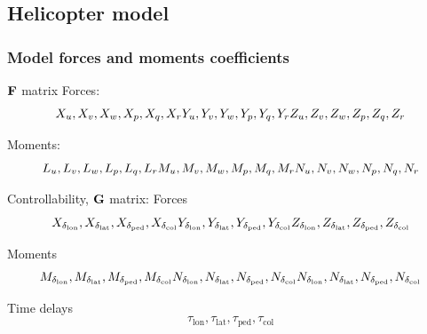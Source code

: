 \subsection{Helicopter model}

  \subsubsection{Model forces and moments coefficients}
    $\mathrm{\textbf{F}}$ matrix
    Forces: 
    $$
    X_u, X_v, X_w, X_p, X_q, X_r \\
    Y_u, Y_v, Y_w, Y_p, Y_q, Y_r \\
    Z_u, Z_v, Z_w, Z_p, Z_q, Z_r
    $$

    Moments:
    $$
    L_u, L_v, L_w, L_p, L_q, L_r \\
    M_u, M_v, M_w, M_p, M_q, M_r \\
    N_u, N_v, N_w, N_p, N_q, N_r
    $$

    Controllability, $\mathrm{\textbf{G}}$ matrix:
    Forces
    $$
    X_{\delta_{\mathrm{lon}}}, X_{\delta_{\mathrm{lat}}}, X_{\delta_{\mathrm{ped}}}, X_{\delta_{\mathrm{col}}} \\
    Y_{\delta_{\mathrm{lon}}}, Y_{\delta_{\mathrm{lat}}}, Y_{\delta_{\mathrm{ped}}}, Y_{\delta_{\mathrm{col}}} \\
    Z_{\delta_{\mathrm{lon}}}, Z_{\delta_{\mathrm{lat}}}, Z_{\delta_{\mathrm{ped}}}, Z_{\delta_{\mathrm{col}}}
    $$

    Moments
    $$
    M_{\delta_{\mathrm{lon}}}, M_{\delta_{\mathrm{lat}}}, M_{\delta_{\mathrm{ped}}}, M_{\delta_{\mathrm{col}}} \\
    N_{\delta_{\mathrm{lon}}}, N_{\delta_{\mathrm{lat}}}, N_{\delta_{\mathrm{ped}}}, N_{\delta_{\mathrm{col}}} \\
    N_{\delta_{\mathrm{lon}}}, N_{\delta_{\mathrm{lat}}}, N_{\delta_{\mathrm{ped}}}, N_{\delta_{\mathrm{col}}}
    $$

    Time delays
    $$
    \tau_{\mathrm{lon}}, \tau_{\mathrm{lat}}, \tau_{\mathrm{ped}}, \tau_{\mathrm{col}}
    $$